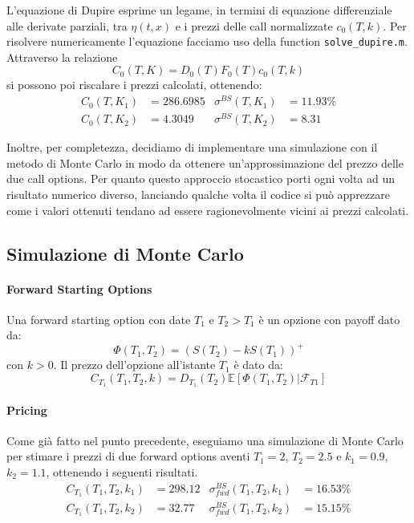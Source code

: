 \documentclass[11pt]{article}
\begin{document}
L'equazione di Dupire esprime un legame, in termini di equazione differenziale alle derivate parziali, tra $\eta(t,x)$ e i prezzi delle call normalizzate $c_0(T,k)$. Per risolvere numericamente l'equazione facciamo uso della function \texttt{solve\_dupire.m}.\\
Attraverso la relazione $$C_0(T,K) = D_0(T)F_0(T)c_0(T,k)$$ 
si possono poi riscalare i prezzi calcolati, ottenendo:
\begin{align*}
C_0(T,K_1) &= 286.6985 & \sigma^{BS}(T,K_1) &= 11.93\%\\
C_0(T,K_2) &= 4.3049 & \sigma^{BS}(T,K_2) &= 8.31
\end{align*}

Inoltre, per completezza, decidiamo di implementare una simulazione con il metodo di Monte Carlo in modo da ottenere un'approssimazione del prezzo delle due call options. Per quanto questo approccio stocastico porti ogni volta ad un risultato numerico diverso, lanciando qualche volta il codice si può apprezzare come i valori ottenuti tendano ad essere ragionevolmente vicini ai prezzi calcolati. 
 

\subsection{Simulazione di Monte Carlo}
\paragraph{Forward Starting Options}
Una forward starting option con date $T_1$ e $T_2 > T_1$ è un opzione con payoff dato da:
\begin{equation}
\Phi(T_1,T_2) = (S(T_2)-kS(T_1))^+
\end{equation}
con $k>0$. Il prezzo dell'opzione all'istante $T_1$ è dato da:
\begin{equation}
C_{T_1}(T_1,T_2,k)= D_{T_1}(T_2)\mathbb{E}[\Phi(T_1,T_2)|\mathcal{F}_{T1}]
\end{equation}

\paragraph{Pricing}
Come già fatto nel punto precedente, eseguiamo una simulazione di Monte Carlo per stimare i prezzi di due forward options aventi $T_1 = 2$, $T_2 = 2.5$ e $k_1=0.9$, $k_2=1.1$, ottenendo i seguenti risultati.\\
\begin{align*}
C_{T_1}(T_1,T_2,k_1) &= 298.12 & \sigma^{BS}_{fwd}(T_1,T_2,k_1) &= 16.53\%\\
C_{T_1}(T_1,T_2,k_2) &= 32.77 & \sigma^{BS}_{fwd}(T_1,T_2,k_2) &= 15.15\%\\
\end{align*}
\end{document}
